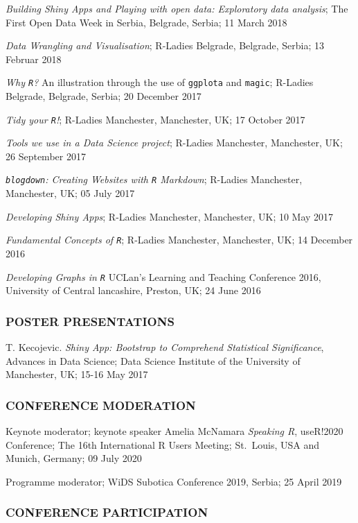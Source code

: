 \documentclass[
]{article}
\begin{document}
\emph{Building Shiny Apps and Playing with open data: Exploratory data
analysis}; The First Open Data Week in Serbia, Belgrade, Serbia; 11
March 2018

\emph{Data Wrangling and Visualisation}; R-Ladies Belgrade, Belgrade,
Serbia; 13 Februar 2018

\emph{Why \texttt{R}?} An illustration through the use of
\texttt{ggplota} and \texttt{magic}; R-Ladies Belgrade, Belgrade,
Serbia; 20 December 2017

\emph{Tidy your \texttt{R}!}; R-Ladies Manchester, Manchester, UK; 17
October 2017

\emph{Tools we use in a Data Science project}; R-Ladies Manchester,
Manchester, UK; 26 September 2017

\emph{\texttt{blogdown}: Creating Websites with \texttt{R} Markdown};
R-Ladies Manchester, Manchester, UK; 05 July 2017

\emph{Developing Shiny Apps}; R-Ladies Manchester, Manchester, UK; 10
May 2017

\emph{Fundamental Concepts of \texttt{R}}; R-Ladies Manchester,
Manchester, UK; 14 December 2016

\emph{Developing Graphs in \texttt{R}} UCLan's Learning and Teaching
Conference 2016, University of Central lancashire, Preston, UK; 24 June
2016

\hypertarget{poster-presentations}{%
\subsubsection{POSTER PRESENTATIONS}\label{poster-presentations}}

T. Kecojevic. \emph{Shiny App: Bootstrap to Comprehend Statistical
Significance}, Advances in Data Science; Data Science Institute of the
University of Manchester, UK; 15-16 May 2017

\hypertarget{conference-moderation}{%
\subsubsection{CONFERENCE MODERATION}\label{conference-moderation}}

Keynote moderator; keynote speaker Amelia McNamara \emph{Speaking R},
useR!2020 Conference; The 16th International R Users Meeting; St.~Louis,
USA and Munich, Germany; 09 July 2020

Programme moderator; WiDS Subotica Conference 2019, Serbia; 25 April
2019

\hypertarget{conference-participation}{%
\subsubsection{CONFERENCE
PARTICIPATION}\label{conference-participation}}
\end{document}
